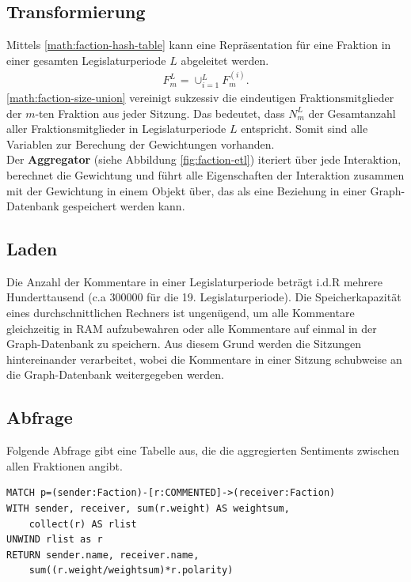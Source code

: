 \subsection{Transformierung}
Mittels \ref{math:faction-hash-table} kann eine Repräsentation für eine Fraktion in einer gesamten Legislaturperiode $L$ abgeleitet werden.
\begin{equation}
    \begin{aligned}
    \label{math:faction-size-union}
    F_{m}^{L} = \cup_{i=1}^{L} F_{m}^{(i)}.
    \end{aligned}
\end{equation}
\ref{math:faction-size-union} vereinigt sukzessiv die eindeutigen Fraktionsmitglieder der $m$-ten Fraktion aus jeder Sitzung. Das bedeutet, dass $N_m^{L}$ der Gesamtanzahl
aller Fraktionsmitglieder in Legislaturperiode $L$ entspricht. Somit sind alle Variablen zur Berechung der Gewichtungen vorhanden.\\
Der \textbf{Aggregator} (siehe Abbildung \ref{fig:faction-etl}) iteriert über jede Interaktion, berechnet die Gewichtung und führt alle Eigenschaften der
Interaktion zusammen mit der Gewichtung in einem Objekt über, das als eine Beziehung in einer Graph-Datenbank gespeichert werden kann. 
\subsection{Laden}
Die Anzahl der Kommentare in einer Legislaturperiode beträgt i.d.R mehrere Hunderttausend (c.a $300 000$ für die 19. Legislaturperiode). 
Die Speicherkapazität eines durchschnittlichen Rechners ist ungenügend, um alle Kommentare gleichzeitig in RAM aufzubewahren oder alle Kommentare auf einmal 
in der Graph-Datenbank zu speichern. Aus diesem Grund werden die Sitzungen hintereinander verarbeitet, wobei die Kommentare in einer Sitzung schubweise 
an die Graph-Datenbank weitergegeben werden.

\subsection{Abfrage}
Folgende Abfrage gibt eine Tabelle aus, die die aggregierten Sentiments zwischen allen Fraktionen angibt.
\begin{verbatim}
MATCH p=(sender:Faction)-[r:COMMENTED]->(receiver:Faction) 
WITH sender, receiver, sum(r.weight) AS weightsum,
	collect(r) AS rlist 
UNWIND rlist as r 
RETURN sender.name, receiver.name,
	sum((r.weight/weightsum)*r.polarity)
\end{verbatim}

